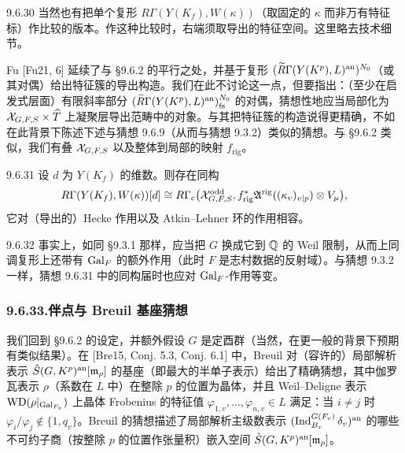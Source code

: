 \begin{rem}{9.6.30}\label{rem:a4-16-9-6-30}
当然也有把单个复形 $R\Gamma(Y(K_f),W(\kappa))$（取固定的 $\kappa$ 而非万有特征标）作比较的版本。作这种比较时，右端须取导出的特征空间。这里略去技术细节。
\end{rem}

Fu [Fu21, 6] 延续了与 §9.6.2 的平行之处，并基于复形 $(\widetilde R\Gamma(Y(K^p),L)^{\mathrm{an}})^{N_0}$（或其对偶）给出特征簇的导出构造。我们在此不讨论这一点，但要指出：（至少在启发式层面）有限斜率部分 $(\widetilde R\Gamma(Y(K^p),L)^{\mathrm{an}})^{N_0}_{\mathrm{fs}}$ 的对偶，猜想性地应当局部化为 $\mathcal{X}_{G,F,S}\times\widehat T$ 上凝聚层导出范畴中的对象。与其把特征簇的构造说得更精确，不如在此背景下陈述下述与猜想 9.6.9（从而与猜想 9.3.2）类似的猜想。与 §9.6.2 类似，我们有叠 $\mathcal{X}_{G,F,S}$ 以及整体到局部的映射 $f_{\mathrm{rig}}$。

\begin{conj}{9.6.31}\label{conj:a4-16-9-6-31}
设 $d$ 为 $Y(K_f)$ 的维数。则存在同构
\[
R\Gamma(Y(K_f),W(\kappa))[d]\cong R\Gamma_c\bigl(\mathcal{X}^{\mathrm{odd}}_{G,F,S},f_{\mathrm{rig}}^*\mathfrak A^{\mathrm{rig}}((\kappa_v)_{v|p})\otimes V_\mu\bigr),
\]
它对（导出的）Hecke 作用以及 Atkin--Lehner 环的作用相容。
\end{conj}

\begin{rem}{9.6.32}\label{rem:a4-16-9-6-32}
事实上，如同 §9.3.1 那样，应当把 $G$ 换成它到 $\mathbb{Q}$ 的 Weil 限制，从而上同调复形上还带有 $\operatorname{Gal}_F$ 的额外作用（此时 $F$ 是志村数据的反射域）。与猜想 9.3.2 一样，猜想 9.6.31 中的同构届时也应对 $\operatorname{Gal}_F$-作用等变。
\end{rem}

\subsubsection*{9.6.33.\quad 伴点与 Breuil 基座猜想}

我们回到 §9.6.2 的设定，并额外假设 $G$ 是定酉群（当然，在更一般的背景下预期有类似结果）。在 [Bre15, Conj. 5.3, Conj. 6.1] 中，Breuil 对（容许的）局部解析表示 $\hat S(G,K^p)^{\mathrm{an}}[\mathfrak{m}_\rho]$ 的基座（即最大的半单子表示）给出了精确猜想，其中伽罗瓦表示 $\rho$（系数在 $L$ 中）在整除 $p$ 的位置为晶体，并且 Weil--Deligne 表示 $\mathrm{WD}(\rho|_{\operatorname{Gal}_{F_v}})$ 上晶体 Frobenius 的特征值 $\varphi_{1,v},\dots,\varphi_{n,v}\in L$ 满足：当 $i\neq j$ 时 $\varphi_i/\varphi_j\notin\{1,q_v\}$。Breuil 的猜想描述了局部解析主级数表示 $(\operatorname{Ind}_{B_v}^{G(F_v)}\delta_v)^{\mathrm{an}}$ 的哪些不可约子商（按整除 $p$ 的位置作张量积）嵌入空间 $\hat S(G,K^p)^{\mathrm{an}}[\mathfrak{m}_\rho]$。

